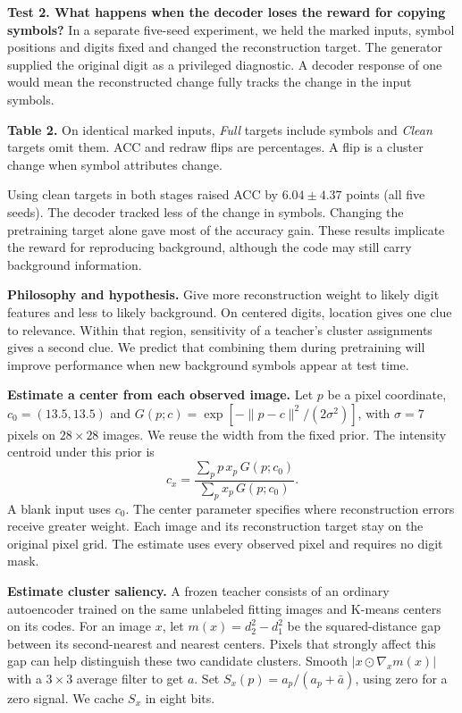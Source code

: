 \documentclass[11pt,letterpaper]{article}
\newcommand{\sect}[1]{\vspace{3pt}{\sffamily\large\bfseries\color{ink}#1}\par}
\newcommand{\capn}[1]{{\small\color{ink}#1}\par}
\begin{document}
\textbf{Test 2. What happens when the decoder loses the reward for copying symbols?} In a separate five-seed experiment, we held the marked inputs, symbol positions and digits fixed and changed the reconstruction target. The generator supplied the original digit as a privileged diagnostic. A decoder response of one would mean the reconstructed change fully tracks the change in the input symbols.
\begin{center}\small\end{center}
\capn{\textbf{Table 2.} On identical marked inputs, \emph{Full} targets include symbols and \emph{Clean} targets omit them. ACC and redraw flips are percentages. A flip is a cluster change when symbol attributes change.}
Using clean targets in both stages raised ACC by $6.04\pm4.37$ points (all five seeds). The decoder tracked less of the change in symbols. Changing the pretraining target alone gave most of the accuracy gain. These results implicate the reward for reproducing background, although the code may still carry background information.

\textbf{Philosophy and hypothesis.} Give more reconstruction weight to likely digit features and less to likely background. On centered digits, location gives one clue to relevance. Within that region, sensitivity of a teacher's cluster assignments gives a second clue. We predict that combining them during pretraining will improve performance when new background symbols appear at test time.

\newpage
\sect{4 \quad Adaptive Gaussian reconstruction}
\textbf{Estimate a center from each observed image.} Let $p$ be a pixel coordinate, $c_0=(13.5,13.5)$ and $G(p;c)=\exp[-\|p-c\|^2/(2\sigma^2)]$, with $\sigma=7$ pixels on $28\times28$ images. We reuse the width from the fixed prior. The intensity centroid under this prior is
\[
 c_x=\frac{\sum_p p\,x_p\,G(p;c_0)}{\sum_p x_p\,G(p;c_0)} .
\]
A blank input uses $c_0$. The center parameter specifies where reconstruction errors receive greater weight. Each image and its reconstruction target stay on the original pixel grid. The estimate uses every observed pixel and requires no digit mask.

\textbf{Estimate cluster saliency.} A frozen teacher consists of an ordinary autoencoder trained on the same unlabeled fitting images and K-means centers on its codes. For an image $x$, let $m(x)=d_2^2-d_1^2$ be the squared-distance gap between its second-nearest and nearest centers. Pixels that strongly affect this gap can help distinguish these two candidate clusters. Smooth $|x\odot\nabla_xm(x)|$ with a $3\times3$ average filter to get $a$. Set $S_x(p)=a_p/(a_p+\bar a)$, using zero for a zero signal. We cache $S_x$ in eight bits.
\end{document}
